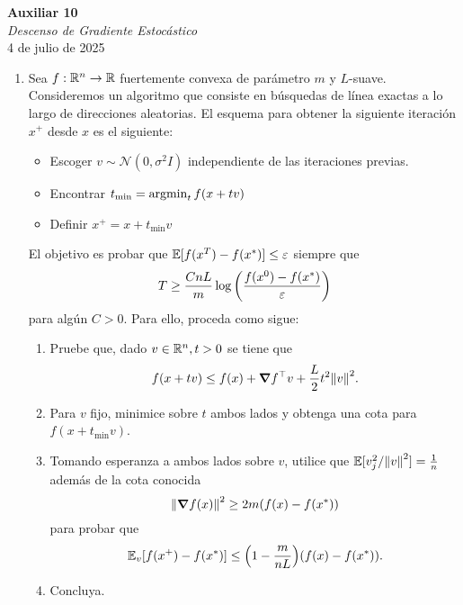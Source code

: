 \documentclass{article}
\begin{document}


\begin{center}
	\Huge{\textbf{Auxiliar 10}}\\
	\textit{\large{Descenso de Gradiente Estocástico}}\\
	\normalsize
	4 de julio de 2025
\end{center}

\begin{enumerate}
	\item Sea \(f: \mathbb{R}^n \to \mathbb{R}\) fuertemente convexa de parámetro \(m\) y \(L\)-suave. Consideremos un algoritmo que consiste en búsquedas de línea exactas a lo largo de direcciones aleatorias. El esquema para obtener la siguiente iteración \(x^+\) desde \(x\) es el siguiente:
	      \begin{itemize}
		      \item Escoger \(v \sim \mathcal{N}(0, \sigma^2 I)\) independiente de las iteraciones previas.
		      \item Encontrar \(t_{\text{min}} = \operatorname{argmin}_{t} f(x + tv)\)
		      \item Definir \(x^+ = x + t_{\text{min}}v\)
	      \end{itemize}
	      El objetivo es probar que \(\mathbb{E}[ f(x^T) - f(x^*) ] \leq \varepsilon\) siempre que
	      \[T \geq \frac{CnL}{m} \log\qty( \frac{f(x^0) - f(x^*)}{\varepsilon})\]
	      para algún \(C>0\). Para ello, proceda como sigue:
	      \begin{enumerate}
		      \item Pruebe que, dado \(v \in \mathbb{R}^n, t > 0\) se tiene que
		            \[f(x + tv) \leq f(x) + \grad f^\top v + \frac{L}{2} t^2 \norm{v}^2.\]
		      \item Para \(v\) fijo, minimice sobre \(t\) ambos lados y obtenga una cota para \(f(x + t_{\text{min}}v)\).
		      \item Tomando esperanza a ambos lados sobre \(v\), utilice que \(\mathbb{E}[v_j^2 / \norm{v}^2] = \frac{1}{n}\) además de la cota conocida
		            \[\norm{\grad f(x)}^2 \geq 2m (f(x) - f(x^*))\]
		            para probar que
		            \[\mathbb{E}_v[f(x^+) - f(x^*)] \leq  \qty(1 - \frac{m}{nL}) \qty(f(x) - f(x^*)).\]
		      \item Concluya.
	      \end{enumerate}
\end{enumerate}
\end{document}
